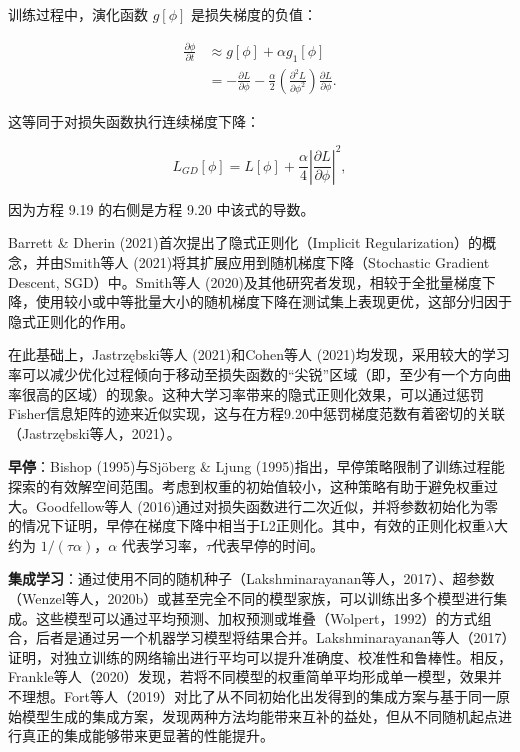 训练过程中，演化函数 \(g[\phi]\) 是损失梯度的负值：


\begin{align}
	\frac{\partial \phi}{\partial t} &\approx g[\phi] + \alpha g_1[\phi] \\
	&= -\frac{\partial L}{\partial \phi} - \frac{\alpha}{2} \left( \frac{\partial^2 L}{\partial \phi^2} \right) \frac{\partial L}{\partial \phi}. 
\end{align} 


这等同于对损失函数执行连续梯度下降：

\begin{equation}
L_{GD}[\phi] = L[\phi] + \frac{\alpha}{4} \left| \frac{\partial L}{\partial \phi} \right|^2 , 
\end{equation}

因为方程 9.19 的右侧是方程 9.20 中该式的导数。

Barrett \& Dherin (2021)首次提出了隐式正则化（Implicit Regularization）的概念，并由Smith等人 (2021)将其扩展应用到随机梯度下降（Stochastic Gradient Descent, SGD）中。Smith等人 (2020)及其他研究者发现，相较于全批量梯度下降，使用较小或中等批量大小的随机梯度下降在测试集上表现更优，这部分归因于隐式正则化的作用。

在此基础上，Jastrzębski等人 (2021)和Cohen等人 (2021)均发现，采用较大的学习率可以减少优化过程倾向于移动至损失函数的“尖锐”区域（即，至少有一个方向曲率很高的区域）的现象。这种大学习率带来的隐式正则化效果，可以通过惩罚Fisher信息矩阵的迹来近似实现，这与在方程9.20中惩罚梯度范数有着密切的关联（Jastrzębski等人，2021）。

\textbf{早停}：Bishop (1995)与Sjöberg \& Ljung (1995)指出，早停策略限制了训练过程能探索的有效解空间范围。考虑到权重的初始值较小，这种策略有助于避免权重过大。Goodfellow等人 (2016)通过对损失函数进行二次近似，并将参数初始化为零的情况下证明，早停在梯度下降中相当于L2正则化。其中，有效的正则化权重\(\lambda\)大约为 \(1/(\tau\alpha)\)，\(\alpha\) 代表学习率，\(\tau\)代表早停的时间。

\textbf{集成学习}：通过使用不同的随机种子（Lakshminarayanan等人，2017）、超参数（Wenzel等人，2020b）或甚至完全不同的模型家族，可以训练出多个模型进行集成。这些模型可以通过平均预测、加权预测或堆叠（Wolpert，1992）的方式组合，后者是通过另一个机器学习模型将结果合并。Lakshminarayanan等人（2017）证明，对独立训练的网络输出进行平均可以提升准确度、校准性和鲁棒性。相反，Frankle等人（2020）发现，若将不同模型的权重简单平均形成单一模型，效果并不理想。Fort等人（2019）对比了从不同初始化出发得到的集成方案与基于同一原始模型生成的集成方案，发现两种方法均能带来互补的益处，但从不同随机起点进行真正的集成能够带来更显著的性能提升。

